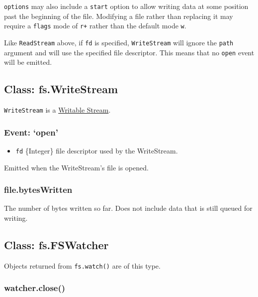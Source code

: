\texttt{options} may also include a \texttt{start} option to allow
writing data at some position past the beginning of the file. Modifying
a file rather than replacing it may require a \texttt{flags} mode of
\texttt{r+} rather than the default mode \texttt{w}.

Like \texttt{ReadStream} above, if \texttt{fd} is specified,
\texttt{WriteStream} will ignore the \texttt{path} argument and will use
the specified file descriptor. This means that no \texttt{open} event
will be emitted.

\subsection{Class: fs.WriteStream}\label{class-fs.writestream}

\texttt{WriteStream} is a
\href{stream.html\#stream_class_stream_writable}{Writable Stream}.

\subsubsection{\texorpdfstring{Event:
`open'}{Event: open}}\label{event-open-1}

\begin{itemize}
\itemsep1pt\parskip0pt
\item
  \texttt{fd} \{Integer\} file descriptor used by the WriteStream.
\end{itemize}

Emitted when the WriteStream's file is opened.

\subsubsection{file.bytesWritten}\label{file.byteswritten}

The number of bytes written so far. Does not include data that is still
queued for writing.

\subsection{Class: fs.FSWatcher}\label{class-fs.fswatcher}

Objects returned from \texttt{fs.watch()} are of this type.

\subsubsection{watcher.close()}\label{watcher.close}

